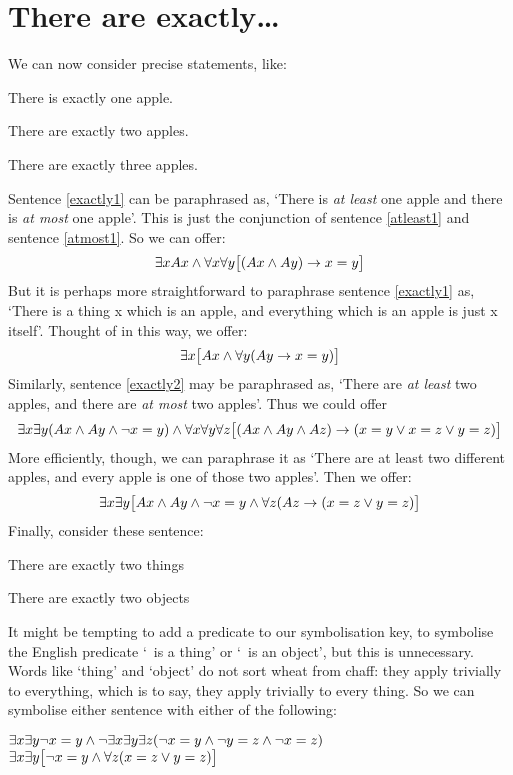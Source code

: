 \section{There are exactly\ldots}
We can now consider precise statements, like:
\begin{earg}
\item[\ex{exactly1}] There is exactly one apple.
\item[\ex{exactly2}] There are exactly two apples.
\item[\ex{exactly3}] There are exactly three apples.
\end{earg}
Sentence \ref{exactly1} can be paraphrased as, `There is \emph{at least} one apple and there is \emph{at most} one apple'. This is just the conjunction of sentence \ref{atleast1} and sentence \ref{atmost1}. So we can offer:
$$\exists x Ax \wedge \forall x\forall y\bigl[(Ax \wedge Ay) \rightarrow x=y\bigr]$$
But it is perhaps more straightforward to paraphrase sentence \ref{exactly1} as, `There is a thing x which is an apple, and everything which is an apple is just x itself'. Thought of in this way, we offer: 
$$\exists x\bigl[Ax \wedge \forall y(Ay \rightarrow x= y)\bigr]$$
Similarly, sentence \ref{exactly2} may be paraphrased as, `There are \emph{at least} two apples, and there are \emph{at most} two apples'. Thus we could offer 
$$\exists x \exists y(Ax \wedge Ay \wedge \neg x = y) \wedge \forall x\forall y\forall z\bigl[(Ax \wedge Ay \wedge Az) \rightarrow (x=y \vee x=z \vee y=z)\bigr]$$
More efficiently, though, we can paraphrase it as `There are at least two different apples, and every apple is one of those two apples'. Then we offer:
$$\exists x\exists y\bigl[Ax \wedge Ay \wedge \neg x = y \wedge \forall z(Az \rightarrow ( x= z \vee y = z)\bigr]$$
Finally, consider these sentence:
\begin{earg}
\item[\ex{exactly2things}] There are exactly two things
\item[\ex{exactly2objects}] There are exactly two objects
\end{earg}
It might be tempting to add a predicate to our symbolisation key, to symbolise the English predicate `\blank\ is a thing' or `\blank\ is an object', but this is unnecessary. Words like `thing' and `object' do not sort wheat from chaff: they apply trivially to everything, which is to say, they apply trivially to every thing. So we can symbolise either sentence with either of the following:
	\begin{center}
		$\exists x \exists y \neg x = y \wedge \neg \exists x \exists y \exists z (\neg x = y \wedge \neg y = z \wedge \neg x = z)$\\
		$\exists x \exists y \bigl[\neg x = y \wedge \forall z(x=z \vee y = z)\bigr]$
	\end{center}

